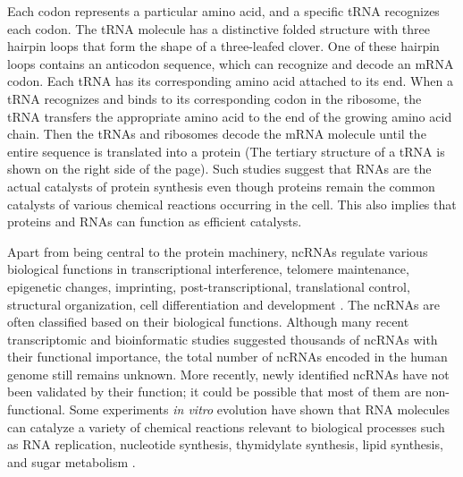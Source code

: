 Each codon represents a particular amino acid, and a specific tRNA recognizes each codon. The tRNA molecule has a distinctive folded structure with three hairpin loops that form the shape of a three-leafed clover. One of these hairpin loops contains an anticodon sequence, which can recognize and decode an mRNA codon. Each tRNA has its corresponding amino acid attached to its end. When a tRNA recognizes and binds to its corresponding codon in the ribosome, the tRNA transfers the appropriate amino acid to the end of the growing amino acid chain. Then the tRNAs and ribosomes decode the mRNA molecule until the entire sequence is translated into a protein (The tertiary structure of a tRNA is shown on the right side of the page). Such studies suggest that RNAs are the actual catalysts of protein synthesis even though proteins remain the common catalysts of various chemical reactions occurring in the cell. This also implies that proteins and RNAs can function as efficient catalysts. 


Apart from being central to the protein machinery, ncRNAs regulate various biological functions in transcriptional interference, telomere maintenance, epigenetic changes, imprinting, post-transcriptional, translational control, structural organization, cell differentiation and development \cite{fatica2014long,santosh2015non}. The ncRNAs are often classified based on their biological functions. Although many recent transcriptomic and bioinformatic studies suggested thousands of ncRNAs with their functional importance, the total number of ncRNAs encoded in the human genome still remains unknown. More recently, newly identified ncRNAs have not been validated by their function; it could be possible that most of them are non-functional. Some experiments \textit{in vitro} evolution have shown that RNA molecules can catalyze a variety of chemical reactions relevant to biological processes such as RNA replication, nucleotide synthesis, thymidylate synthesis, lipid synthesis, and sugar metabolism \cite{robertson1990selection,ellington2009evolutionary}. 

